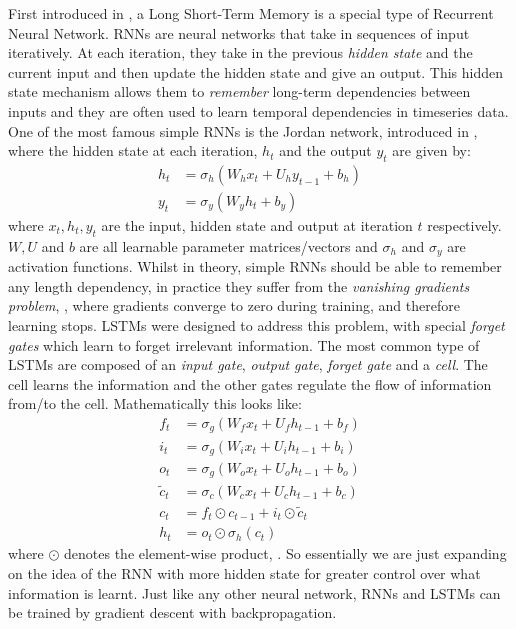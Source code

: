 First introduced in \cite{HOCHREITER1997}, a Long Short-Term Memory 
is a special type of Recurrent Neural Network.
RNNs are neural networks that take in sequences of input iteratively. At each iteration,
they take in the previous \textit{hidden state} and the current input and then update
the hidden state and give an output. This hidden state mechanism allows them 
to \textit{remember} long-term dependencies between inputs and they are often used to learn temporal dependencies in timeseries data.
One of the most famous simple RNNs is the Jordan network, introduced in \cite{JORDAN1997},
where the hidden state at each iteration, $h_t$ and the output $y_t$ are given by:
\begin{equation}
    \begin{aligned}
        h_t &= \sigma_h(W_h x_t + U_h y_{t-1} + b_h)  \\
        y_t &= \sigma_y(W_y h_t + b_y)
    \end{aligned}
\end{equation}
where $x_t, h_t, y_t$ are the input, hidden state and output at iteration $t$ respectively.
$W, U$ and $b$ are all learnable parameter matrices/vectors and $\sigma_h$ and $\sigma_y$ are activation functions.
Whilst in theory, simple RNNs should be able to remember any length dependency, in practice
they suffer from the \textit{vanishing gradients problem}, \cite{PASCANU2013}, where
gradients converge to zero during training, and therefore learning stops.
LSTMs were designed to address this problem, with special \textit{forget gates} which
learn to forget irrelevant information.
The most common type of LSTMs are composed of an \textit{input gate}, \textit{output gate}, \textit{forget gate}
and a \textit{cell}. The cell learns the information and the other gates regulate the flow of information from/to the cell.
Mathematically this looks like:
\begin{equation}
    \begin{aligned}
        f_t &= \sigma_g(W_f x_t + U_f h_{t-1} + b_f) \\
        i_t &= \sigma_g(W_i x_t + U_i h_{t-1} + b_i) \\
        o_t &= \sigma_g(W_o x_t + U_o h_{t-1} + b_o) \\
        \tilde{c}_t &= \sigma_c(W_c x_t + U_c h_{t-1} + b_c) \\
                c_t &= f_t \odot c_{t-1} + i_t \odot \tilde{c}_t \\
        h_t &= o_t \odot \sigma_h(c_t)
    \end{aligned}
\end{equation}
where $\odot$ denotes the element-wise product, \cite{SCHMIDHUBER1999}.
So essentially we are just expanding on the idea of the RNN with more hidden state
for greater control over what information is learnt.
Just like any other neural network, RNNs and LSTMs can be trained by gradient descent
with backpropagation.


